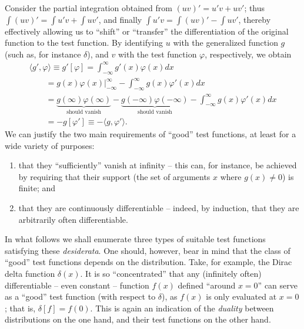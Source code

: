 Consider the partial integration
obtained from $(uv)' = u'v+uv'$; thus
$\int (uv)' = \int u'v+\int uv'$,
and finally   $\int u'v = \int (uv)'  -\int uv'$,
thereby effectively allowing us to ``shift'' or ``transfer''
the differentiation of the original function to the test function.
By identifying $u$ with the generalized function $g$ (such as, for instance  $\delta$),
and $v$ with the test function $\varphi$, respectively, we obtain
\begin{equation}
\begin{split}
\langle g' ,    \varphi  \rangle
\equiv
g'[\varphi] =
\int_{-\infty}^\infty
g'(x)\varphi(x)
dx      \\
\qquad
=
\left.
g(x)\varphi(x)\right|_{-\infty}^\infty
-  \int_{-\infty}^\infty
g(x)\varphi'(x)
dx           \\
\qquad
=
\underbrace{g(\infty)\varphi(\infty)}_{\textrm{should vanish}} - \underbrace{g(-\infty)\varphi(-\infty)}_{\textrm{should vanish}}
-  \int_{-\infty}^\infty
g(x)\varphi'(x)
dx  \\
\qquad
= - g[\varphi'] \equiv   -   \langle g ,    \varphi'  \rangle
.
\end{split}
\label{2012-m-ch-di-desiderata}
\end{equation}
We can justify the two main requirements of ``good'' test functions, at least for a wide variety of purposes:
\begin{enumerate}
\item
that they ``sufficiently'' vanish at infinity -- this can, for instance, be achieved by requiring that their support
(the set of arguments $x$ where $g(x)\neq 0$) is finite; and
\item
that they are continuously differentiable -- indeed, by induction, that they are arbitrarily often differentiable.
\end{enumerate}

In what follows we shall enumerate three types of suitable test functions satisfying these {\it desiderata}.
One should, however, bear in mind that the class of ``good'' test functions depends on the distribution.
Take, for example, the Dirac delta function $\delta (x)$. It is so ``concentrated'' that any (infinitely often)
differentiable -- even constant -- function $f(x)$ defined ``around $x=0$''
can serve as a ``good'' test function (with respect to $\delta$),
as $f(x)$ is only evaluated at $x=0$; that is, $\delta[f]=f(0)$.
This is again an indication of the {\em duality} between distributions on the one hand,
and their test functions on the other hand.

